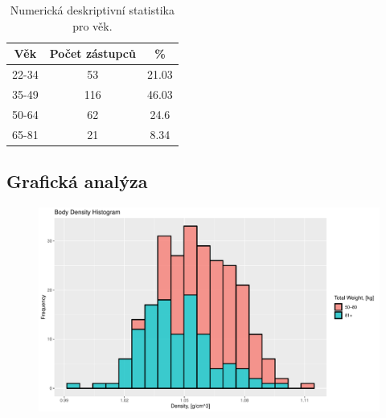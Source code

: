 \documentclass[11pt,american,czech]{article}
\begin{document}
\begin{table}[ht!]
	\centering
	\begin{tabular}{|c||c|c|}
		\hline 
		Věk &  Počet zástupců &  \%   \\ 
		\hline \hline 
		22-34 & 53 & 21.03   \\
		\hline
		35-49 & 116 & 46.03  \\
		\hline  
		50-64 & 62 &  24.6  \\
		\hline 
		65-81 & 21 &  8.34  \\
		\hline 
	
	\end{tabular} 
	\caption{Numerická deskriptivní statistika pro věk.}
	\label{tab:desc2}	
\end{table}
 
\subsection{Grafická analýza}

\begin{figure}[ht!]
	\centering
	\includegraphics[width=1.0\linewidth]{Images/FIGURES/body_density_histogram}
	\caption{}
	\label{fig:body_density_histogram}
\end{figure}
\end{document}
